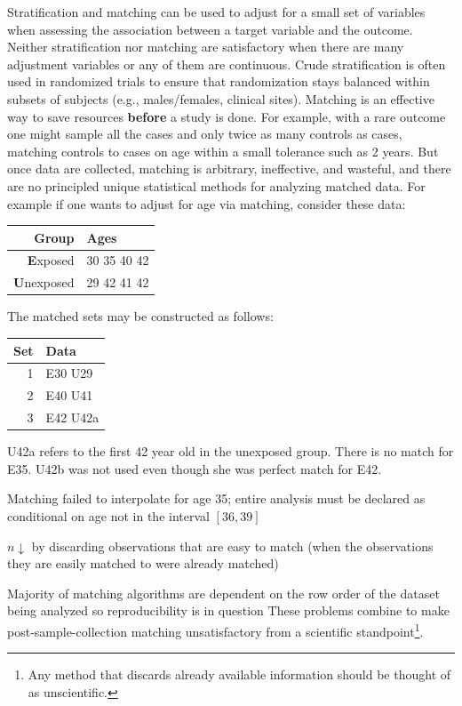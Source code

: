 Stratification and matching can be used to adjust for a small set of
variables when assessing the association between a target variable and
the outcome.  Neither stratification nor matching are satisfactory
when there are many adjustment variables or any of them are
continuous.  Crude stratification is often used in randomized trials
to ensure that randomization stays balanced within subsets of subjects
(e.g., males/females, clinical sites).  Matching is an effective way
to save resources \textbf{before} a study is done.  For example, with
a rare outcome one might sample all the cases and only twice as many
controls as cases, matching controls to cases on age within a small
tolerance such as 2 years.  But once data are collected, matching is
arbitrary, ineffective, and wasteful, and there are no principled
unique statistical methods for analyzing matched data.  For example if
one wants to adjust for age via matching, consider these data:
\begin{center}\begin{tabular}{rl} \hline
Group & Ages \\ \hline
\textbf{E}xposed   & 30 35 40 42 \\
\textbf{U}nexposed & 29 42 41 42 \\ \hline
\end{tabular}\end{center}
The matched sets may be constructed as follows:
\begin{center}\begin{tabular}{rl} \hline
Set & Data \\ \hline
1 & E30 U29 \\
2 & E40 U41 \\
3 & E42 U42a \\ \hline
\end{tabular}\end{center}
U42a refers to the first 42 year old in the unexposed group.  There is no match for E35.  U42b was not used even though she was perfect match for E42.
\be
\item Matching failed to interpolate for age 35; entire analysis must be declared as conditional on age not in the interval $[36,39]$
\item $n \downarrow$ by discarding observations that are easy to match (when the observations they are easily matched to were already matched)
\item Majority of matching algorithms are dependent on the row order of the dataset being analyzed so reproducibility is in question
\ee
These problems combine to make post-sample-collection matching unsatisfactory from a scientific standpoint\footnote{Any method that discards already available information should be thought of as unscientific.}.

